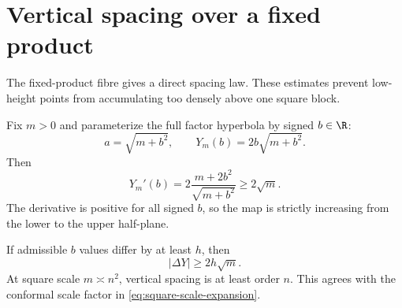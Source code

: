 \section{Vertical spacing over a fixed product}
\label{sec:vertical-spacing}

The fixed-product fibre gives a direct spacing law.  These estimates prevent low-height points from accumulating too densely above one square block.

Fix $m>0$ and parameterize the full factor hyperbola by signed $b\in\R$:
\begin{equation}
 a=\sqrt{m+b^2},
 \qquad
 Y_m(b)=2b\sqrt{m+b^2}.
 \label{eq:Y-b}
\end{equation}
Then
\begin{equation}
 Y_m'(b)
 =2\frac{m+2b^2}{\sqrt{m+b^2}}
 \ge2\sqrt m.
 \label{eq:Y-derivative}
\end{equation}
The derivative is positive for all signed $b$, so the map is strictly increasing from the lower to the upper half-plane.

If admissible $b$ values differ by at least $h$, then
\begin{equation}
 |\Delta Y|\ge2h\sqrt m.
 \label{eq:Y-spacing}
\end{equation}
At square scale $m\asymp n^2$, vertical spacing is at least order $n$.  This agrees with the conformal scale factor in \cref{eq:square-scale-expansion}.

